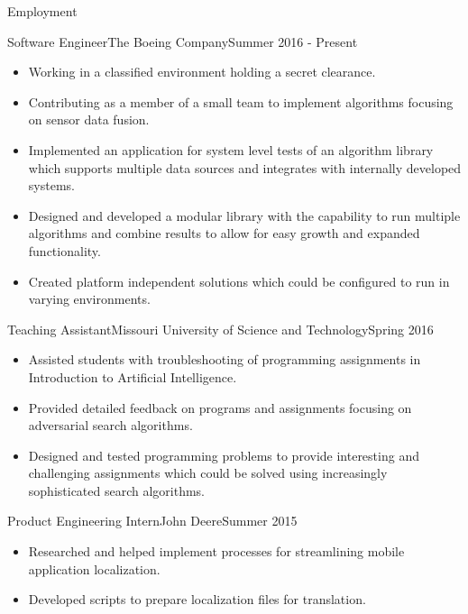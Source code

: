 \documentclass[]{mcdowellcv}
\begin{document}
\makeheader

\begin{cvsection}{Employment}

\begin{boeing}
    \begin{cvsubsection}{Software Engineer}{The Boeing Company}{Summer 2016 - Present}         
        \begin{itemize}
            \item Working in a classified environment holding a secret clearance.
            \item Contributing as a member of a small team to implement algorithms focusing on sensor data fusion.
            \item Implemented an application for system level tests of an algorithm library which supports multiple data sources and integrates with internally developed systems. 
            \item Designed and developed a modular library with the capability to run multiple algorithms and combine results to allow for easy growth and expanded functionality.
            \item Created platform independent solutions which could be configured to run in varying environments.
        \end{itemize}
    \end{cvsubsection}
\end{boeing}
    
\begin{aigrader}
    \begin{cvsubsection}[2]{Teaching Assistant}{Missouri University of Science and Technology}{Spring 2016}
        \begin{itemize}
            \item Assisted students with troubleshooting of programming assignments in Introduction to Artificial Intelligence.
            \item Provided detailed feedback on programs and assignments focusing on adversarial search algorithms.
            \item Designed and tested programming problems to provide interesting and challenging assignments which could be solved using increasingly sophisticated search algorithms.
        \end{itemize}
    \end{cvsubsection}
\end{aigrader}

\begin{johndeere}
    \begin{cvsubsection}{Product Engineering Intern}{John Deere}{Summer 2015}
        \begin{itemize}
            \item Researched and helped implement processes for streamlining mobile application localization.
            \item Developed scripts to prepare localization files for translation.
        \end{itemize}
    \end{cvsubsection}
\end{johndeere}
    

\end{cvsection}
\end{document}
